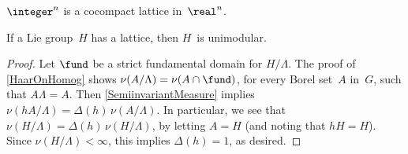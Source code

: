\begin{eg}
 $\integer^n$ is a cocompact lattice in~$\real^n$. 
 \end{eg}

\begin{prop}
 If a Lie group~$H$ has a lattice, then $H$~is unimodular.
 \end{prop}

\begin{proof}
 Let $\fund$ be a strict fundamental domain for $H/\Lambda$.
 The proof of \cref{HaarOnHomog} shows $\nu(A/\Lambda) = \nu(A \cap \fund)$, for every Borel set~$A$ in~$G$, such that $A \Lambda = A$. Then \cref{SemiinvariantMeasure} implies $\nu(hA/\Lambda) = \Delta(h) \, \nu(A/\Lambda)$. In particular, we see that $\nu(H/\Lambda) = \Delta(h) \, \nu(H/\Lambda)$, by letting $A = H$  (and noting that $hH = H$).
Since $\nu(H/\Lambda) < \infty$, this implies $\Delta(h) = 1$, as desired.
 \end{proof}


